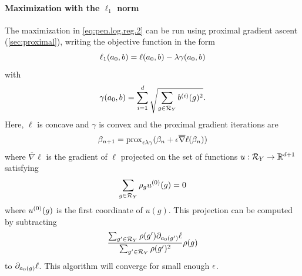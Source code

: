 \paragraph{Maximization with the $\ell_1$ norm}
 The maximization in \cref{eq:pen.log.reg.2} can be run using proximal gradient ascent (\cref{sec:proximal}), writing the objective function in the form
\[
\ell_1({a_0}, b) = \ell({a_0}, b) - \lambda \gamma({a_0}, b)
\]
 with 
 \[
 \gamma({a_0}, b) = \sum_{i=1}^d \sqrt{\sum_{g\in {\mathcal R}_Y} b^{(i)}(g)^2}.
 \]
Here, $\ell$ is concave and $\gamma$ is convex and the proximal gradient iterations are
\begin{equation}
\label{eq:log.reg.prox}
\beta_{n+1} = \operatorname{prox}_{\epsilon\lambda \gamma} (\beta_n + \epsilon \overline{\nabla} \ell(\beta_n))
\end{equation}
where $\overline{\nabla} \ell$ is the gradient of $\ell$ projected on the set of functions $u: {\mathcal R}_Y \to {\mathbb{R}}^{d+1}$ satisfying
\[
\sum_{g\in {\mathcal R}_Y} \rho_g u^{(0)}( g) = 0
\]
where $u^{(0)}(g)$ is the first coordinate of $u(g)$. This projection can be computed by subtracting 
\[
\frac{\sum_{g'\in {\mathcal R}_Y} \rho(g') \partial_{{a_0}(g')}\ell}{\sum_{g'\in {\mathcal R}_Y} \rho(g')^2} \rho(g)
\]
to $\partial_{{a_0}(g)} \ell$. 
This algorithm will converge for small enough $\epsilon$. 

